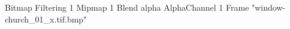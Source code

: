 {Bitmap
	{Filtering 1}
	{Mipmap 1}
	{Blend alpha}
	{AlphaChannel 1}
	{Frame "window-church_01_x.tif.bmp"}
}
